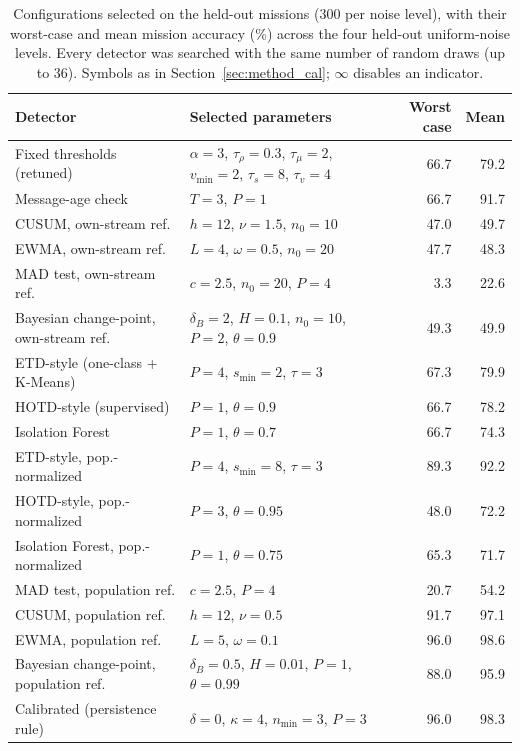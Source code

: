 \begin{table}[t]
\centering
\caption{Configurations selected on the held-out missions (300 per noise level), with their worst-case and mean mission accuracy (\%) across the four held-out uniform-noise levels. Every detector was searched with the same number of random draws (up to 36). Symbols as in Section~\ref{sec:method_cal}; $\infty$ disables an indicator.}
\label{tab:tuned}
\footnotesize
\begin{tabular}{lp{}rr}
\hline
Detector & Selected parameters & Worst case & Mean \\
\hline
Fixed thresholds (retuned) & $\alpha=3$, $\tau_\rho=0.3$, $\tau_\mu=2$, $v_{\min}=2$, $\tau_s=8$, $\tau_v=4$ & 66.7 & 79.2 \\
Message-age check & $T=3$, $P=1$ & 66.7 & 91.7 \\
CUSUM, own-stream ref. & $h=12$, $\nu=1.5$, $n_0=10$ & 47.0 & 49.7 \\
EWMA, own-stream ref. & $L=4$, $\omega=0.5$, $n_0=20$ & 47.7 & 48.3 \\
MAD test, own-stream ref. & $c=2.5$, $n_0=20$, $P=4$ & 3.3 & 22.6 \\
Bayesian change-point, own-stream ref. & $\delta_B=2$, $H=0.1$, $n_0=10$, $P=2$, $\theta=0.9$ & 49.3 & 49.9 \\
ETD-style (one-class + K-Means) & $P=4$, $s_{\min}=2$, $\tau=3$ & 67.3 & 79.9 \\
HOTD-style (supervised) & $P=1$, $\theta=0.9$ & 66.7 & 78.2 \\
Isolation Forest & $P=1$, $\theta=0.7$ & 66.7 & 74.3 \\
ETD-style, pop.-normalized & $P=4$, $s_{\min}=8$, $\tau=3$ & 89.3 & 92.2 \\
HOTD-style, pop.-normalized & $P=3$, $\theta=0.95$ & 48.0 & 72.2 \\
Isolation Forest, pop.-normalized & $P=1$, $\theta=0.75$ & 65.3 & 71.7 \\
MAD test, population ref. & $c=2.5$, $P=4$ & 20.7 & 54.2 \\
CUSUM, population ref. & $h=12$, $\nu=0.5$ & 91.7 & 97.1 \\
EWMA, population ref. & $L=5$, $\omega=0.1$ & 96.0 & 98.6 \\
Bayesian change-point, population ref. & $\delta_B=0.5$, $H=0.01$, $P=1$, $\theta=0.99$ & 88.0 & 95.9 \\
Calibrated (persistence rule) & $\delta=0$, $\kappa=4$, $n_{\min}=3$, $P=3$ & 96.0 & 98.3 \\
\hline
\end{tabular}
\end{table}

